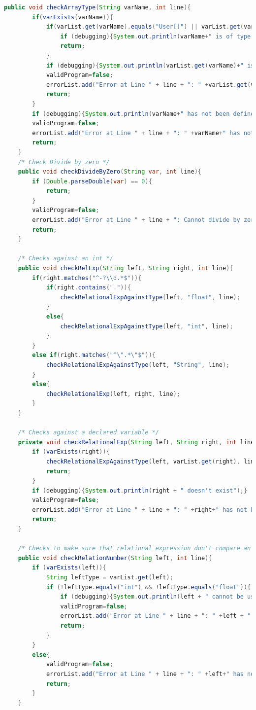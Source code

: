\documentclass[12pt]{report}
\begin{document}
\begin{singlespace}
\begin{lstlisting}[language=Java,label=some-code,caption={Flood$\_$Sem.java}]
	public void checkArrayType(String varName, int line){
		if(varExists(varName)){
			if(varList.get(varName).equals("User[]") || varList.get(varName).equals("Player[]")){
				if (debugging){System.out.println(varName+" is of type "+varList.get(varName));}
				return;
			}
			if (debugging){System.out.println(varList.get(varName)+" is not a valid array type.");}
			validProgram=false;
			errorList.add("Error at Line " + line + ": " +varList.get(varName)+" is not a valid array type.");
			return;
		}
		if (debugging){System.out.println(varName+" has not been defined.");}
		validProgram=false;
		errorList.add("Error at Line " + line + ": " +varName+" has not been defined.");
		return;
	}
	/* Check Divide by zero */
	public void checkDivideByZero(String var, int line){
		if (Double.parseDouble(var) == 0){
			return;
		}
		validProgram=false;
		errorList.add("Error at Line " + line + ": Cannot divide by zero.");
		return;
	}
	
	/* Checks against an int */
	public void checkRelExp(String left, String right, int line){
		if(right.matches("^-?\\d.*$")){
			if(right.contains(".")){
				checkRelationalExpAgainstType(left, "float", line);
			}
			else{
				checkRelationalExpAgainstType(left, "int", line);
			}
		}
		else if(right.matches("^\".*\"$")){
			checkRelationalExpAgainstType(left, "String", line);
		}
		else{
			checkRelationalExp(left, right, line);
		}
	}
	
	/* Checks against a declared variable */
	private void checkRelationalExp(String left, String right, int line){
		if (varExists(right)){
			checkRelationalExpAgainstType(left, varList.get(right), line);
			return;
		}
		if (debugging){System.out.println(right + " doesn't exist");}
		validProgram=false;
		errorList.add("Error at Line " + line + ": " +right+" has not been defined.");
		return;
	}

	/* Checks to make sure that relational expression don't compare an invalid type */
	public void checkRelationNumber(String left, int line){
		if (varExists(left)){
			String leftType = varList.get(left);
			if (!leftType.equals("int") && !leftType.equals("float")){
				if (debugging){System.out.println(left + " cannot be used because it is of type " + leftType);}
				validProgram=false;
				errorList.add("Error at Line " + line + ": " +left + " cannot be used because it is of type " + leftType + ".");
				return;
			}
		}
		else{
			validProgram=false;
			errorList.add("Error at Line " + line + ": " +left+" has not been defined.");
			return;
		}
	}


\end{lstlisting}
\end{singlespace}
\end{document}
